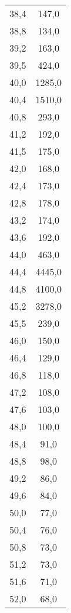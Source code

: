 \begin{longtable}{ S S }
    38,4 & 147,0 \\
    38,8 & 134,0 \\
    39,2 & 163,0 \\
    39,5 & 424,0 \\
    40,0 & 1285,0 \\
    40,4 & 1510,0 \\
    40,8 & 293,0 \\
    41,2 & 192,0 \\
    41,5 & 175,0 \\
    42,0 & 168,0 \\
    42,4 & 173,0 \\
    42,8 & 178,0 \\
    43,2 & 174,0 \\
    43,6 & 192,0 \\
    44,0 & 463,0 \\
    44,4 & 4445,0 \\
    44,8 & 4100,0 \\
    45,2 & 3278,0 \\
    45,5 & 239,0 \\
    46,0 & 150,0 \\
    46,4 & 129,0 \\
    46,8 & 118,0 \\
    47,2 & 108,0 \\
    47,6 & 103,0 \\
    48,0 & 100,0 \\
    48,4 & 91,0 \\
    48,8 & 98,0 \\
    49,2 & 86,0 \\
    49,6 & 84,0 \\
    50,0 & 77,0 \\
    50,4 & 76,0 \\
    50,8 & 73,0 \\
    51,2 & 73,0 \\
    51,6 & 71,0 \\
    52,0 & 68,0 \\
\end{longtable}
